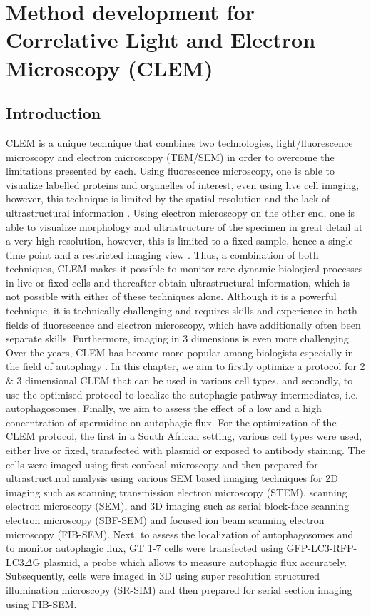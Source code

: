 \chapter{Method development for Correlative Light and Electron Microscopy (CLEM)}
\label{sec:chapter6}
\section{Introduction}
CLEM is a unique technique that combines two technologies, light/fluorescence microscopy and electron microscopy (TEM/SEM) in order to overcome the limitations presented by each. Using fluorescence microscopy, one is able to visualize labelled proteins and organelles of interest, even using live cell imaging, however, this technique is limited by the spatial resolution and the lack of ultrastructural information \citep{Russell2017}. Using electron microscopy on the other end, one is able to visualize morphology and ultrastructure of the specimen in great detail at a very high resolution, however, this is limited to a fixed sample, hence a single time point and a restricted imaging view \citep{Liss2016,Russell2017}. Thus, a combination of both techniques, CLEM makes it possible to monitor rare dynamic biological processes in live or fixed cells and thereafter obtain ultrastructural information, which is not possible with either of these techniques alone. Although it is a powerful technique, it is technically challenging and requires skills and experience in both fields of fluorescence and electron microscopy, which have additionally often been separate skills. Furthermore, imaging in 3 dimensions is even more challenging. Over the years, CLEM has become more popular among biologists especially in the field of autophagy \citep{Duke2014,Hosseini2014, Russell2017,Gudmundsson2019}. In this chapter, we aim to firstly optimize a protocol for 2 \& 3 dimensional CLEM that can be used in various cell types, and secondly, to use the optimised protocol to localize the autophagic pathway intermediates, i.e. autophagosomes. Finally, we aim to assess the effect of a low and a high concentration of spermidine on autophagic flux. For the optimization of the CLEM protocol, the first in a South African setting, various cell types were used, either live or fixed, transfected with plasmid or exposed to antibody staining. The cells were imaged using first confocal microscopy and then prepared for ultrastructural analysis using various SEM based imaging techniques for 2D imaging such as scanning transmission electron microscopy (STEM), scanning electron microscopy (SEM), and 3D imaging such as serial block-face scanning electron microscopy (SBF-SEM) and focused ion beam scanning electron microscopy (FIB-SEM). Next, to assess the localization of autophagosomes and to monitor autophagic flux, GT 1-7 cells were transfected using GFP-LC3-RFP-LC3$\Delta$G plasmid, a probe which allows to measure autophagic flux accurately. Subsequently, cells were imaged in 3D using super resolution structured illumination microscopy (SR-SIM) and then prepared for serial section imaging using FIB-SEM. 


